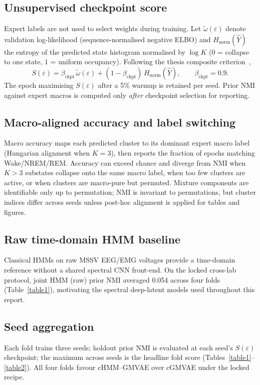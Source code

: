 \subsection{Unsupervised checkpoint score}
Expert labels are not used to select weights during training.
Let $\tilde{\omega}(\varepsilon)$ denote validation log-likelihood (sequence-normalised negative ELBO) and $H_{\mathrm{norm}}(\hat{Y})$ the entropy of the predicted state histogram normalised by $\log K$ ($0$ = collapse to one state, $1$ = uniform occupancy).
Following the thesis composite criterion~\cite{elmgreen2026thesis},
\begin{equation}
\label{eq:checkpoint}
S(\varepsilon) = \beta_{\mathrm{ckpt}}\,\tilde{\omega}(\varepsilon) + (1-\beta_{\mathrm{ckpt}})\,H_{\mathrm{norm}}(\hat{Y}),
\qquad \beta_{\mathrm{ckpt}} = 0.9.
\end{equation}
The epoch maximising $S(\varepsilon)$ after a 5\% warmup is retained per seed.
Prior NMI against expert macros is computed only \emph{after} checkpoint selection for reporting.

\subsection{Macro-aligned accuracy and label switching}
Macro accuracy maps each predicted cluster to its dominant expert macro label (Hungarian alignment when $K{=}3$), then reports the fraction of epochs matching Wake/NREM/REM.
Accuracy can exceed chance and diverge from NMI when $K>3$ substates collapse onto the same macro label, when too few clusters are active, or when clusters are macro-pure but permuted.
Mixture components are identifiable only up to permutation; NMI is invariant to permutations, but cluster indices differ across seeds unless post-hoc alignment is applied for tables and figures.

\subsection{Raw time-domain HMM baseline}
\label{app:methods:hmm_raw}
Classical HMMs on raw MSSV EEG/EMG voltages provide a time-domain reference without a shared spectral CNN front-end.
On the locked cross-lab protocol, joint HMM (raw) prior NMI averaged 0.054 across four folds (Table~\ref{table1}), motivating the spectral deep-latent models used throughout this report.

\subsection{Seed aggregation}
Each fold trains three seeds; holdout prior NMI is evaluated at each seed's $S(\varepsilon)$ checkpoint; the maximum across seeds is the headline fold score (Tables~\ref{table1}--\ref{table2}).
All four folds favour cHMM--GMVAE over cGMVAE under the locked recipe.

